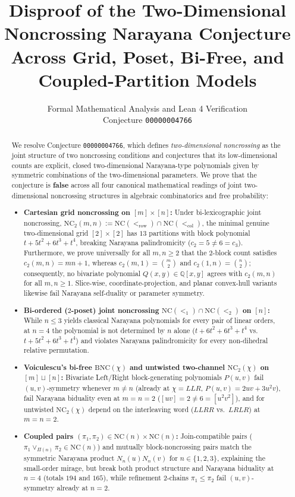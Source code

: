 \documentclass[11pt]{article}
\title{\textbf{Disproof of the Two-Dimensional Noncrossing Narayana Conjecture Across Grid, Poset, Bi-Free, and Coupled-Partition Models}}
\author{Formal Mathematical Analysis and Lean 4 Verification \\ \small Conjecture \texttt{00000004766}}
\date{}
\theoremstyle{plain}
\theoremstyle{definition}
\newcommand{\NC}{\mathrm{NC}}
\newcommand{\BNC}{\mathrm{BNC}}
\newcommand{\Q}{\mathbb{Q}}
\begin{document}
\maketitle

\begin{abstract}
We resolve Conjecture \texttt{00000004766}, which defines \emph{two-dimensional noncrossing} as the joint structure of two noncrossing conditions and conjectures that its low-dimensional counts are explicit, closed two-dimensional Narayana-type polynomials given by symmetric combinations of the two-dimensional parameters. We prove that the conjecture is \textbf{false} across all four canonical mathematical readings of joint two-dimensional noncrossing structures in algebraic combinatorics and free probability:
\begin{itemize}\setlength{\itemsep}{2pt}
  \item[(I)] \textbf{Cartesian grid noncrossing on $[m] \times [n]$:} Under bi-lexicographic joint noncrossing, $\NC_2(m, n) := \NC(<_{\mathrm{row}}) \cap \NC(<_{\mathrm{col}})$, the minimal genuine two-dimensional grid $[2] \times [2]$ has $13$ partitions with block polynomial $t + 5t^2 + 6t^3 + t^4$, breaking Narayana palindromicity ($c_2 = 5 \ne 6 = c_3$). Furthermore, we prove universally for all $m, n \ge 2$ that the $2$-block count satisfies $c_2(m, n) = mn + 1$, whereas $c_2(m, 1) = \binom{m}{2}$ and $c_2(1, n) = \binom{n}{2}$; consequently, no bivariate polynomial $Q(x, y) \in \Q[x, y]$ agrees with $c_2(m, n)$ for all $m, n \ge 1$. Slice-wise, coordinate-projection, and planar convex-hull variants likewise fail Narayana self-duality or parameter symmetry.
  \item[(II)] \textbf{Bi-ordered ($2$-poset) joint noncrossing $\NC(<_1) \cap \NC(<_2)$ on $[n]$:} While $n \le 3$ yields classical Narayana polynomials for every pair of linear orders, at $n = 4$ the polynomial is not determined by $n$ alone ($t + 6t^2 + 6t^3 + t^4$ vs.\ $t + 5t^2 + 6t^3 + t^4$) and violates Narayana palindromicity for every non-dihedral relative permutation.
  \item[(III)] \textbf{Voiculescu's bi-free $\BNC(\chi)$ and untwisted two-channel $\NC_2(\chi)$ on $[m] \sqcup [n]$:} Bivariate Left/Right block-generating polynomials $P(u, v)$ fail $(u, v)$-symmetry whenever $m \ne n$ (already at $\chi = LLR$, $P(u, v) = 2uv + 3u^2v$), fail Narayana biduality even at $m = n = 2$ ($[uv] = 2 \ne 6 = [u^2v^2]$), and for untwisted $\NC_2(\chi)$ depend on the interleaving word ($LLRR$ vs.\ $LRLR$) at $m = n = 2$.
  \item[(IV)] \textbf{Coupled pairs $(\pi_1, \pi_2) \in \NC(n) \times \NC(n)$:} Join-compatible pairs ($\pi_1 \vee_{\Pi(n)} \pi_2 \in \NC(n)$) and mutually block-noncrossing pairs match the symmetric Narayana product $N_n(u) N_n(v)$ for $n \in \{1, 2, 3\}$, explaining the small-order mirage, but break both product structure and Narayana biduality at $n = 4$ (totals $194$ and $165$), while refinement $2$-chains $\pi_1 \le \pi_2$ fail $(u, v)$-symmetry already at $n = 2$.

\end{itemize}
\end{abstract}
\end{document}
